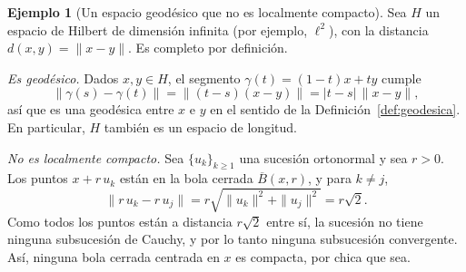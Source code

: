 \documentclass[12pt, a4paper]{amsart}
\theoremstyle{definition}
\newtheorem{ejemplo}[teorema]{Ejemplo}
\theoremstyle{remark}
\newcommand{\Bc}{\overline{B}}
\begin{document}
\begin{ejemplo}[Un espacio geodésico que no es localmente compacto]\label{ej:hilbert}
Sea $H$ un espacio de Hilbert de dimensión infinita (por ejemplo, $\ell^2$), con la distancia $d(x,y)=\|x-y\|$. Es completo por definición.

\emph{Es geodésico.} Dados $x,y\in H$, el segmento $\gamma(t)=(1-t)x+ty$ cumple
\[
\|\gamma(s)-\gamma(t)\|=\|(t-s)(x-y)\|=|t-s|\,\|x-y\|,
\]
así que es una geodésica entre $x$ e $y$ en el sentido de la Definición~\ref{def:geodesica}. En particular, $H$ también es un espacio de longitud.

\emph{No es localmente compacto.} Sea $\{u_k\}_{k\ge1}$ una sucesión ortonormal y sea $r>0$. Los puntos $x+r\,u_k$ están en la bola cerrada $\Bc(x,r)$, y para $k\ne j$,
\[
\|r\,u_k-r\,u_j\|=r\sqrt{\|u_k\|^2+\|u_j\|^2}=r\sqrt2.
\]
Como todos los puntos están a distancia $r\sqrt2$ entre sí, la sucesión no tiene ninguna subsucesión de Cauchy, y por lo tanto ninguna subsucesión convergente. Así, ninguna bola cerrada centrada en $x$ es compacta, por chica que sea.
\end{ejemplo}
\end{document}
